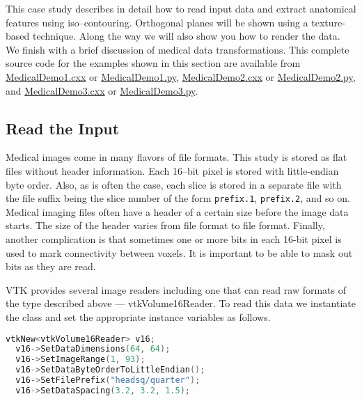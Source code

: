 This case study describes in detail how to read input data and extract anatomical features using iso--contouring. Orthogonal planes will be shown using a texture-based technique. Along the way we will also show you how to render the data. We finish with a brief discussion of medical data transformations. This complete source code for the examples shown in this section are available from
\href{https://lorensen.github.io/VTKExamples/site/Cxx/Medical/MedicalDemo1/}{MedicalDemo1.cxx} or \href{https://lorensen.github.io/VTKExamples/site/Python/Medical/MedicalDemo1/}{MedicalDemo1.py},
\href{https://lorensen.github.io/VTKExamples/site/Cxx/Medical/MedicalDemo2/}{MedicalDemo2.cxx} or \href{https://lorensen.github.io/VTKExamples/site/Python/Medical/MedicalDemo2/}{MedicalDemo2.py}, and
\href{https://lorensen.github.io/VTKExamples/site/Cxx/Medical/MedicalDemo3/}{MedicalDemo3.cxx} or \href{https://lorensen.github.io/VTKExamples/site/Python/Medical/MedicalDemo3/}{MedicalDemo3.py}.

\subsection{Read the Input}

Medical images come in many flavors of file formats. This study is stored as flat files without header information. Each 16--bit pixel is stored with little-endian byte order. Also, as is often the case, each slice is stored in a separate file with the file suffix being the slice number of the form \texttt{prefix.1}, \texttt{prefix.2}, and so on. Medical imaging files often have a header of a certain size before the image data starts. The size of the header varies from file format to file format. Finally, another complication is that sometimes one or more bits in each 16-bit pixel is used to mark connectivity between voxels. It is important to be able to mask out bits as they are read.

VTK provides several image readers including one that can read raw formats of the type described above --- vtkVolume16Reader. To read this data we instantiate the class and set the appropriate instance variables as follows.

\begin{lstlisting}[language=C++, caption={Reading raw formatted files.}]
  vtkNew<vtkVolume16Reader> v16;
  v16->SetDataDimensions(64, 64);
  v16->SetImageRange(1, 93);
  v16->SetDataByteOrderToLittleEndian();
  v16->SetFilePrefix("headsq/quarter");
  v16->SetDataSpacing(3.2, 3.2, 1.5);
\end{lstlisting}


